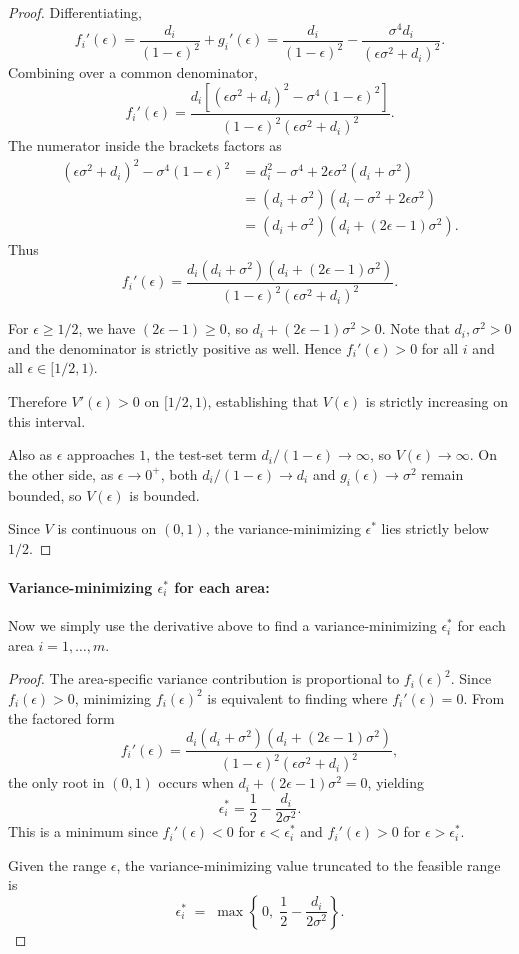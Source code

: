 \documentclass[11pt]{article}
\theoremstyle{plain}
\theoremstyle{definition}
\theoremstyle{remark}
\begin{document}
\begin{proof}
Differentiating,
\[
f_i'(\epsilon) = \frac{d_i}{(1-\epsilon)^2} + g_i'(\epsilon) = \frac{d_i}{(1-\epsilon)^2} - \frac{\sigma^4 d_i}{(\epsilon\sigma^2 + d_i)^2}.
\]
Combining over a common denominator,
\[
f_i'(\epsilon) = \frac{d_i \left[(\epsilon\sigma^2 + d_i)^2 - \sigma^4(1-\epsilon)^2\right]}{(1-\epsilon)^2(\epsilon\sigma^2 + d_i)^2}.
\]
The numerator inside the brackets factors as
\begin{align*}
(\epsilon\sigma^2 + d_i)^2 - \sigma^4(1-\epsilon)^2
&= d_i^2 - \sigma^4 + 2\epsilon\sigma^2(d_i + \sigma^2) \\
&= (d_i + \sigma^2)(d_i - \sigma^2 + 2\epsilon\sigma^2) \\
&= (d_i + \sigma^2)(d_i + (2\epsilon - 1)\sigma^2).
\end{align*}
Thus
\[
f_i'(\epsilon) = \frac{d_i(d_i + \sigma^2)(d_i + (2\epsilon - 1)\sigma^2)}{(1-\epsilon)^2(\epsilon\sigma^2 + d_i)^2}.
\]

For $\epsilon \geq 1/2$, we have $(2\epsilon - 1) \geq 0$, so $d_i + (2\epsilon - 1)\sigma^2 > 0$. Note that $d_i, \sigma^2 >0$ and the denominator is strictly positive as well. Hence $f_i'(\epsilon) > 0$ for all $i$ and all $\epsilon \in [1/2, 1)$.

Therefore $V'(\epsilon) > 0$ on $[1/2, 1)$, establishing that $V(\epsilon)$ is strictly increasing on this interval.

Also as $\epsilon$ approaches $1$, the test-set term $d_i/(1-\epsilon) \to \infty$, so $V(\epsilon) \to \infty$. On the other side, as $\epsilon \to 0^+$, both $d_i/(1-\epsilon) \to d_i$ and $g_i(\epsilon) \to \sigma^2$ remain bounded, so $V(\epsilon)$ is bounded.

Since $V$ is continuous on $(0,1)$, the variance-minimizing $\epsilon^*$ lies strictly below $1/2$.
\end{proof}

\paragraph{Variance-minimizing $\epsilon_i^*$ for each area:}

Now we simply use the derivative above to find a variance-minimizing $\epsilon_i^*$ for each area $i=1, \ldots, m.$
\begin{proof}
The area-specific variance contribution is proportional to $f_i(\epsilon)^2$. Since $f_i(\epsilon) > 0$, minimizing $f_i(\epsilon)^2$ is equivalent to finding where $f_i'(\epsilon) = 0$. From the factored form
\[
f_i'(\epsilon) = \frac{d_i(d_i + \sigma^2)(d_i + (2\epsilon - 1)\sigma^2)}{(1-\epsilon)^2(\epsilon\sigma^2 + d_i)^2},
\]
the only root in $(0,1)$ occurs when $d_i + (2\epsilon - 1)\sigma^2 = 0$, yielding
\[
\epsilon_i^* = \frac{1}{2} - \frac{d_i}{2\sigma^2}.
\]
This is a minimum since $f_i'(\epsilon) < 0$ for $\epsilon < \epsilon_i^*$ and $f_i'(\epsilon) > 0$ for $\epsilon > \epsilon_i^*$.

Given the range $\epsilon$, the variance-minimizing value truncated to the feasible range is
\[
\epsilon_i^* \;=\; \max\!\left\{\,0,\; \frac{1}{2} - \frac{d_i}{2\sigma^2}\right\}.
\]
\end{proof}
\end{document}
